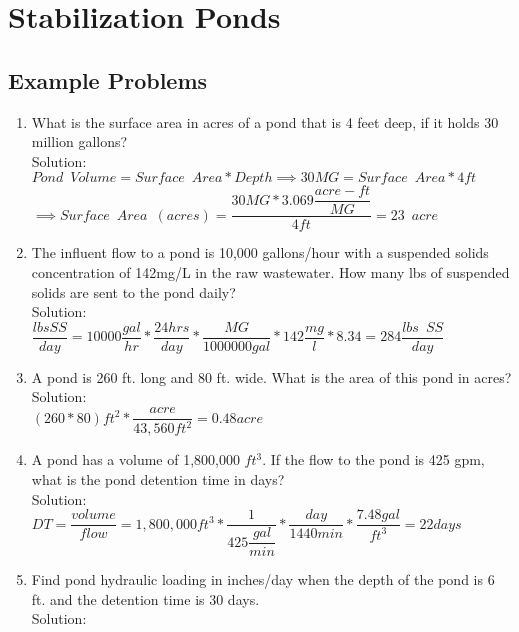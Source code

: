 \newpage

\section{Stabilization Ponds}

\subsection{Example Problems} 

\begin{enumerate}

\item What is the surface area in acres of a pond that is 4 feet deep, if it holds 30 million gallons?\\

Solution:\\
$Pond \enspace Volume= Surface \enspace Area*Depth \implies 30MG=Surface \enspace Area*4ft$\\
$ \implies Surface \enspace Area \enspace (acres)=\dfrac{30MG*3.069\dfrac{acre-ft}{MG}}{4ft}=\boxed{23 \enspace acre}$


\item The influent flow to a pond is 10,000 gallons/hour with a suspended solids concentration of 142mg/L in the raw wastewater.  How many lbs of suspended solids are sent to the pond daily?
\\
Solution:\\
$\dfrac{lbs SS}{day}=10000\dfrac{gal}{hr}*\dfrac{24hrs}{day}*\dfrac{MG}{1000000gal}*142\dfrac{mg}{l}*8.34=\boxed{284\dfrac{lbs \enspace SS}{day}}$


\item A pond is 260 ft. long and 80 ft. wide. What is the area of this pond in acres?\\ 
Solution:\\
$(260*80)ft^2*\dfrac{acre}{43,560ft^2}=\boxed{0.48acre}$

\item A pond has a volume of 1,800,000 $ft^3$. If the flow to the pond is 425 gpm, what is the pond detention time in days?
\\
Solution:\\
$DT=\dfrac{volume}{flow}=1,800,000ft^3*\dfrac{1}{425\dfrac{gal}{min}}*\dfrac{day}{1440min}*\dfrac{7.48gal}{ft^3}=\boxed{22days}$

\item Find pond hydraulic loading in inches/day when the depth of the pond is 6 ft. and the detention time is 30 days.\\
Solution:\\


\end{enumerate}
